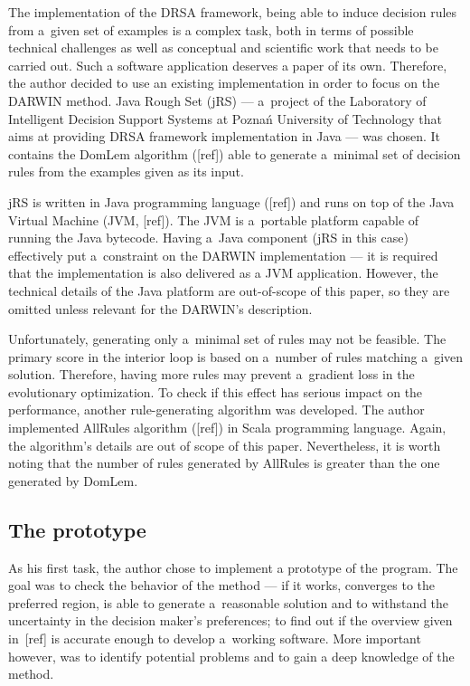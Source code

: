 The implementation of the DRSA framework, being able to induce decision rules
from a~given set of examples is a complex task, both in terms of possible
technical challenges as well as conceptual and scientific work that needs to
be carried out. Such a software application deserves a paper of its
own. Therefore, the author decided to use an existing implementation in order
to focus on the DARWIN method. Java Rough Set (jRS) --- a~project of the
Laboratory of Intelligent Decision Support Systems at Poznań University of
Technology that aims at providing DRSA framework implementation in Java ---
was chosen. It contains the DomLem algorithm ([ref]) able to generate
a~minimal set of decision rules from the examples given as its input.

jRS is written in Java programming language ([ref]) and runs on top of the
Java Virtual Machine (JVM, [ref]). The JVM is a~portable platform capable of
running the Java bytecode. Having a~Java component (jRS in this case)
effectively put a~constraint on the DARWIN implementation --- it is required
that the implementation is also delivered as a JVM application. However, the
technical details of the Java platform are out-of-scope of this paper, so they
are omitted unless relevant for the DARWIN's description.

Unfortunately, generating only a~minimal set of rules may not be feasible. The
primary score in the interior loop is based on a~number of rules matching
a~given solution. Therefore, having more rules may prevent a~gradient loss in
the evolutionary optimization. To check if this effect has serious impact on
the performance, another rule-generating algorithm was developed. The author
implemented AllRules algorithm ([ref]) in Scala programming language. Again,
the algorithm's details are out of scope of this paper. Nevertheless, it is
worth noting that the number of rules generated by AllRules is greater than
the one generated by DomLem.

\subsection{The prototype}

As his first task, the author chose to implement a prototype of the
program. The goal was to check the behavior of the method --- if it works,
converges to the preferred region, is able to generate a~reasonable solution
and to withstand the uncertainty in the decision maker's preferences; to find
out if the overview given in~[ref] is accurate enough to develop a~working
software. More important however, was to identify potential problems and to
gain a deep knowledge of the method.

